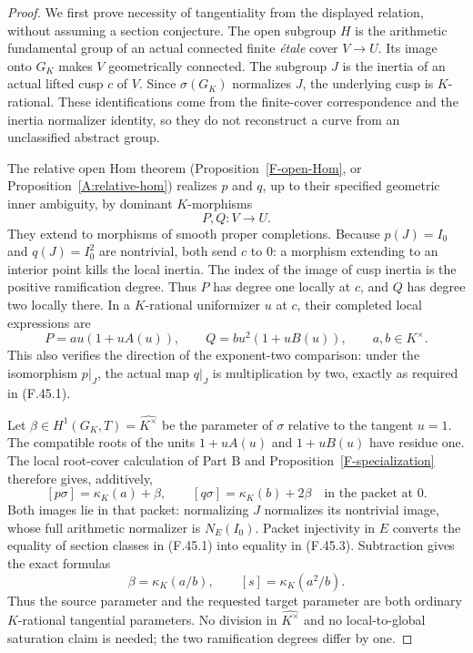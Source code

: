 \documentclass[11pt,oneside]{article}
\begin{document}
\begin{proof}
We first prove necessity of tangentiality from the displayed
relation, without assuming a section conjecture. The open subgroup
$H$ is the arithmetic fundamental group of an actual connected
finite \emph{\'etale} cover $V\to U$. Its image onto $G_K$ makes
$V$ geometrically connected. The subgroup $J$ is the inertia of
an actual lifted cusp $c$ of $V$. Since $\sigma(G_K)$ normalizes
$J$, the underlying cusp is $K$-rational. These identifications
come from the finite-cover correspondence and the inertia
normalizer identity, so they do not reconstruct a curve from an
unclassified abstract group.

The relative open Hom theorem
(Proposition~\ref{F-open-Hom}, or
Proposition~\ref{A:relative-hom}) realizes $p$ and $q$, up to
their specified geometric inner ambiguity, by dominant
$K$-morphisms
\[
                          P,Q:V\longrightarrow U.
\]
They extend to morphisms of smooth proper completions. Because
$p(J)=I_0$ and $q(J)=I_0^2$ are nontrivial, both send $c$ to
$0$: a morphism extending to an interior point kills the local
inertia. The index of the image of cusp inertia is the positive
ramification degree. Thus $P$ has degree one locally at $c$, and
$Q$ has degree two locally there. In a $K$-rational uniformizer
$u$ at $c$, their completed local expressions are
\[
 P=a u(1+uA(u)),\qquad
 Q=b u^2(1+uB(u)),\qquad a,b\in K^\times.
 \tag{F.45.2}
\]
This also verifies the direction of the exponent-two comparison:
under the isomorphism $p|_J$, the actual map $q|_J$ is
multiplication by two, exactly as required in (F.45.1).

Let $\beta\in H^1(G_K,T)=\widehat{K^\times}$ be the parameter
of $\sigma$ relative to the tangent $u=1$. The compatible roots
of the units $1+uA(u)$ and $1+uB(u)$ have residue one. The local
root-cover calculation of Part B and
Proposition~\ref{F-specialization} therefore gives, additively,
\[
 [p\sigma]=\kappa_K(a)+\beta,
       \qquad [q\sigma]=\kappa_K(b)+2\beta
       \quad\text{in the packet at }0.
 \tag{F.45.3}
\]
Both images lie in that packet: normalizing $J$ normalizes its
nontrivial image, whose full arithmetic normalizer is
$N_E(I_0)$. Packet injectivity in $E$ converts the equality of
section classes in (F.45.1) into equality in (F.45.3). Subtraction
gives the exact formulas
\[
 \beta=\kappa_K(a/b),\qquad
                  [s]=\kappa_K(a^2/b).
 \tag{F.45.4}
\]
Thus the source parameter and the requested target parameter are
both ordinary $K$-rational tangential parameters. No division in
$\widehat{K^\times}$ and no local-to-global saturation claim is
needed; the two ramification degrees differ by one.


\end{proof}
\end{document}
